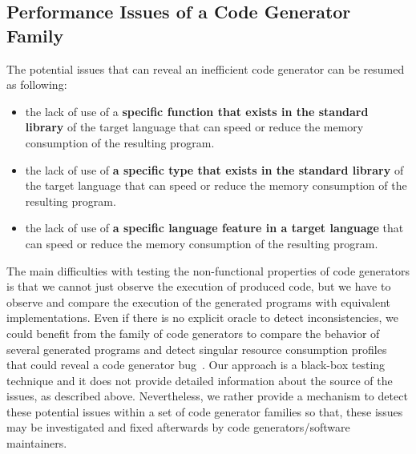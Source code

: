 \subsection{Performance Issues of a Code Generator Family}

The potential issues that can reveal an inefficient code generator can be resumed as following:
\begin{itemize}
	\setlength\itemsep{0em}
	\item  the lack of use of a \textbf{specific function that exists in the standard library} of the target language  that can speed or reduce the memory consumption of the resulting program.
	\item the lack of use of \textbf{a specific type that exists in the standard library} of the target language  that can speed or reduce the memory consumption of the resulting program.
	\item  the lack of use of\textbf{ a specific language feature in a target language}  that can speed or reduce the memory consumption of the resulting program. 
\end{itemize}


The main difficulties with testing the non-functional properties of code generators is that we cannot just observe the execution of produced code, but we have to observe and compare the execution of the generated programs with equivalent implementations. Even if there is no explicit oracle to detect inconsistencies, we could benefit from the family of code generators to compare the behavior of several generated programs and detect singular resource consumption profiles that could reveal a code generator bug~\cite{hundt2011loop}. 
Our approach is a black-box testing technique and it does not provide detailed information about the source of the issues, as described above. Nevertheless, we rather provide a mechanism to detect these potential issues within a set of code generator families so that, these issues may be investigated and fixed afterwards by code generators/software maintainers.

